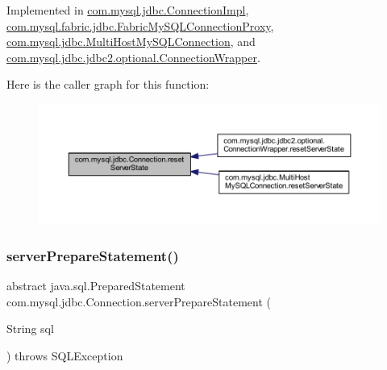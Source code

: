 Implemented in \mbox{\hyperlink{classcom_1_1mysql_1_1jdbc_1_1_connection_impl_a1335fc09ccb7954de9bffc4b59a489aa}{com.\+mysql.\+jdbc.\+Connection\+Impl}}, \mbox{\hyperlink{classcom_1_1mysql_1_1fabric_1_1jdbc_1_1_fabric_my_s_q_l_connection_proxy_a651b3a0b54a792d21b9068f33395971c}{com.\+mysql.\+fabric.\+jdbc.\+Fabric\+My\+S\+Q\+L\+Connection\+Proxy}}, \mbox{\hyperlink{classcom_1_1mysql_1_1jdbc_1_1_multi_host_my_s_q_l_connection_a5099a4923c0bc5e2bfb8236dfe88453c}{com.\+mysql.\+jdbc.\+Multi\+Host\+My\+S\+Q\+L\+Connection}}, and \mbox{\hyperlink{classcom_1_1mysql_1_1jdbc_1_1jdbc2_1_1optional_1_1_connection_wrapper_af3edf0f2f10ef1647b70c9d54a9b7290}{com.\+mysql.\+jdbc.\+jdbc2.\+optional.\+Connection\+Wrapper}}.

Here is the caller graph for this function\+:\nopagebreak
\begin{figure}[H]
\begin{center}
\leavevmode
\includegraphics[width=350pt]{interfacecom_1_1mysql_1_1jdbc_1_1_connection_ac618ee80c02d7672e277b3be75304f6e_icgraph}
\end{center}
\end{figure}
\mbox{\label{interfacecom_1_1mysql_1_1jdbc_1_1_connection_a6e2680bb0a1c38613a4788de1916b596}} 
\subsubsection{\texorpdfstring{server\+Prepare\+Statement()}{serverPrepareStatement()}\hspace{0.1cm}{\footnotesize\ttfamily [1/6]}}
{\footnotesize\ttfamily abstract java.\+sql.\+Prepared\+Statement com.\+mysql.\+jdbc.\+Connection.\+server\+Prepare\+Statement (\begin{DoxyParamCaption}\item[{String}]{sql }\end{DoxyParamCaption}) throws S\+Q\+L\+Exception\hspace{0.3cm}{\ttfamily [abstract]}}

